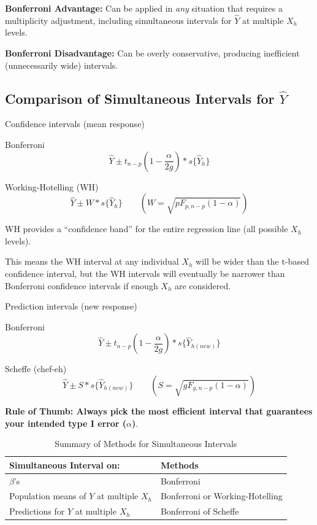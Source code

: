 \documentclass[12pt]{notes}
\begin{document}
\nspace
\bi
\item \textbf{Bonferroni Advantage:} Can be applied in \textit{any} situation that requires a multiplicity adjustment, including simultaneous intervals for $\hat{Y}$ at multiple $X_h$ levels. 
\item \textbf{Bonferroni Disadvantage:} Can be overly conservative, producing inefficient (unnecessarily wide) intervals. 
\ei

\subsection*{Comparison of Simultaneous Intervals for $\hat{Y}$}
\bi
\item Confidence intervals (mean response)
\bi
\item Bonferroni
\[
\hat{Y} \pm t_{n-p}(1-\frac{\alpha}{2g})*s\{\hat{Y}_h\}
\]
\item Working-Hotelling (WH)
\[
\hat{Y} \pm W*s\{\hat{Y}_h\} \qquad \left(W = \sqrt{pF_{p, n-p}(1-\alpha)}\right)
\]

\begin{minipage}[l][2cm][c]{\textwidth}
\end{minipage}

\bi
\item WH provides a ``confidence band'' for the entire regression line (all possible $X_h$ levels). 
\item This means the WH interval at any individual $X_h$ will be wider than the t-based confidence interval, but the WH intervals will eventually be narrower than Bonferroni confidence intervals if enough $X_h$ are considered. 
\ei
\ei

\item Prediction intervals (new response)

\bi
\item Bonferroni
\[
\hat{Y} \pm t_{n-p}(1-\frac{\alpha}{2g})*s\{\hat{Y}_{h (new)}\}
\]
\item Scheffe (chef-eh)
\[
\hat{Y} \pm S*s\{\hat{Y}_{h (new)}\} \qquad \left(S = \sqrt{gF_{g, n-p}(1-\alpha)}\right)
\]
\ei
\ei

\textbf{Rule of Thumb: Always pick the most efficient interval that guarantees your intended type I error ($\alpha$)}. 

\nspace

\begin{table}[H]
\centering
\caption{Summary of Methods for Simultaneous Intervals}
\begin{tabular}{|l|l|}
\hline
\textbf{Simultaneous Interval on:} & \textbf{Methods} \\ \hline
$\beta$'s & Bonferroni \\ \hline
Population means of $Y$ at multiple $X_h$ & Bonferroni or Working-Hotelling \\ \hline
Predictions for $Y$ at multiple $X_h$ & Bonferroni of Scheffe \\ \hline
\end{tabular}
\end{table}
\end{document}
